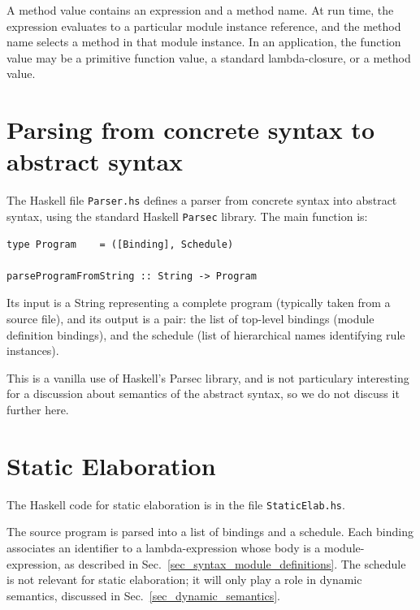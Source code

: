 \documentclass[11pt]{article}
\newcommand{\term}[1]{\texttt{#1}}
\begin{document}
A method value contains an expression and a method name.  At run time,
the expression evaluates to a particular module instance reference,
and the method name selects a method in that module instance.  In an
application, the function value may be a primitive function value, a
standard lambda-closure, or a method value.


\section{Parsing from concrete syntax to abstract syntax}

\label{sec_parsing}

The Haskell file {\tt Parser.hs} defines a parser from concrete syntax
into abstract syntax, using the standard Haskell \term{Parsec}
library.  The main function is:

\begin{Verbatim}[frame=single, commandchars=\\\{\}]
type Program    = ([Binding], Schedule)

parseProgramFromString :: String -> Program
\end{Verbatim}

Its input is a String representing a complete program (typically taken
from a source file), and its output is a pair: the list of top-level
bindings (module definition bindings), and the schedule (list of
hierarchical names identifying rule instances).

This is a vanilla use of Haskell's Parsec library, and is not
particulary interesting for a discussion about semantics of the
abstract syntax, so we do not discuss it further here.


\section{Static Elaboration}

\label{sec_static_elaboration}

The Haskell code for static elaboration is in the file \term{StaticElab.hs}.

The source program is parsed into a list of bindings and a schedule.
Each binding associates an identifier to a lambda-expression whose
body is a module-expression, as described in
Sec.~\ref{sec_syntax_module_definitions}.  The schedule is not
relevant for static elaboration; it will only play a role in dynamic
semantics, discussed in Sec.~\ref{sec_dynamic_semantics}.
\end{document}
